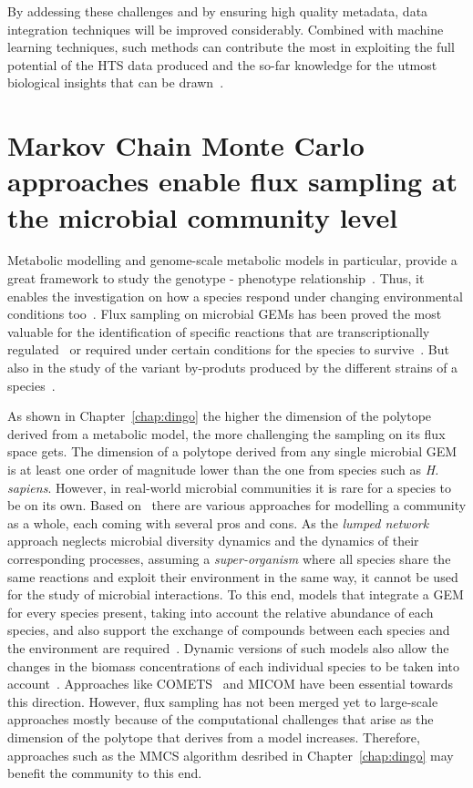       By addessing these challenges and by ensuring high quality metadata,
      data integration techniques will be improved considerably. 
      Combined with machine learning techniques, such methods 
      can contribute the most in exploiting the
      full potential of the HTS data produced
      and the so-far knowledge
      for the utmost biological insights that can be drawn~\citep{noor2019biological}.

\section{Markov Chain Monte Carlo approaches enable flux sampling at the microbial community level}
\label{concl:fluxes}

   Metabolic modelling and genome-scale metabolic models in particular, 
   provide a great framework to study the genotype - phenotype relationship~\citep{lewis2012constraining}.
   Thus, it enables the investigation on how a species respond under changing environmental conditions too~\citep{herrmann2019flux}. 
   Flux sampling on microbial GEMs has been proved the most valuable for 
   the identification of specific reactions that are transcriptionally regulated~\citep{Bordel10}
   or required under certain conditions for the species to survive~\citep{herrmann2019flux}.
   But also in the study of the variant by-produts produced by the different strains of a species~\citep{scott2021metabolic}.

   As shown in Chapter~\ref{chap:dingo} 
   the higher the dimension of the polytope derived from a metabolic model, 
   the more challenging the sampling on its flux space gets.
   The dimension of a polytope derived from any single microbial GEM 
   is at least one order of magnitude lower than 
   the one from species such as \textit{H. sapiens}.
   However, in real-world microbial communities it is rare for a species to be on its own.
   Based on~\cite{perez2016metabolic} there are various approaches for modelling a community as a whole,
   each coming with several pros and cons.
   As the \textit{lumped network} approach 
   neglects microbial diversity dynamics and the dynamics of their corresponding processes, 
   assuming a \textit{super-organism} where all species share the same reactions and exploit their environment in the same way, 
   it cannot be used for the study of microbial interactions. 
   To this end, models that integrate a GEM for every species present, taking into account the relative abundance of each species, 
   and also 
   support the exchange of compounds between each species and the environment are required~\citep{diener2020micom}. 
   Dynamic versions of such models also allow the 
   changes in the biomass concentrations of each individual species to be taken into account~\citep{zhuang2011genome}. 
   Approaches like COMETS~\citep{dukovski2021metabolic} and MICOM 
   have been essential towards this direction. 
   However, flux sampling has not been merged yet to large-scale approaches 
   mostly because of the computational challenges that arise as the dimension of the polytope that derives from a model increases.
   Therefore, approaches such as the MMCS algorithm desribed in Chapter~\ref{chap:dingo} may benefit the community to this end.

